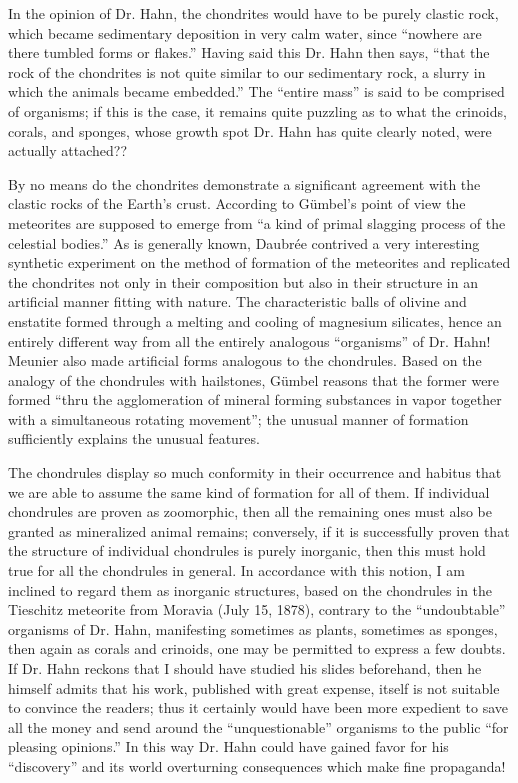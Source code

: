 \documentclass[a4paper, 12pt, oneside]{article}
\begin{document}
In the opinion of Dr. Hahn, the chondrites would have to be purely clastic rock, which became sedimentary deposition in very calm water, since ``nowhere are there tumbled forms or flakes.'' Having said this Dr. Hahn then says, ``that the rock of the chondrites is not quite similar to our sedimentary rock, a slurry in which the animals became embedded.'' The ``entire mass'' is said to be comprised of organisms; if this is the case, it remains quite puzzling as to what the crinoids, corals, and sponges, whose growth spot Dr. Hahn has quite clearly noted, were actually attached??

By no means do the chondrites demonstrate a significant agreement with the clastic rocks of the Earth's crust. According to Gümbel's point of view the meteorites are supposed to emerge from ``a kind of primal slagging process of the celestial bodies.'' As is generally known, Daubrée contrived a very interesting synthetic experiment on the method of formation of the meteorites and replicated the chondrites not only in their composition but also in their structure in an artificial manner fitting with nature. The characteristic balls of olivine and enstatite formed through a melting and cooling of magnesium silicates, hence an entirely different way from all the entirely analogous ``organisms'' of Dr. Hahn! Meunier also made artificial forms analogous to the chondrules. Based on the analogy of the chondrules with hailstones, Gümbel reasons that the former were formed ``thru the agglomeration of mineral forming substances in vapor together with a simultaneous rotating movement''; the unusual manner of formation sufficiently explains the unusual features.

The chondrules display so much conformity in their occurrence and habitus that we are able to assume the same kind of formation for all of them. If individual chondrules are proven as zoomorphic, then all the remaining ones must also be granted as mineralized animal remains; conversely, if it is successfully proven that the structure of individual chondrules is purely inorganic, then this must hold true for all the chondrules in general. In accordance with this notion, I am inclined to regard them as inorganic structures, based on the chondrules in the Tieschitz meteorite from Moravia (July 15, 1878), contrary to the ``undoubtable'' organisms of Dr. Hahn, manifesting sometimes as plants, sometimes as sponges, then again as corals and crinoids, one may be permitted to express a few doubts. If Dr. Hahn reckons that I should have studied his slides beforehand, then he himself admits that his work, published with great expense, itself is not suitable to convince the readers; thus it certainly would have been more expedient to save all the money and send around the ``unquestionable'' organisms to the public ``for pleasing opinions.'' In this way Dr. Hahn could have gained favor for his ``discovery'' and its world overturning consequences which make fine propaganda!
\end{document}
